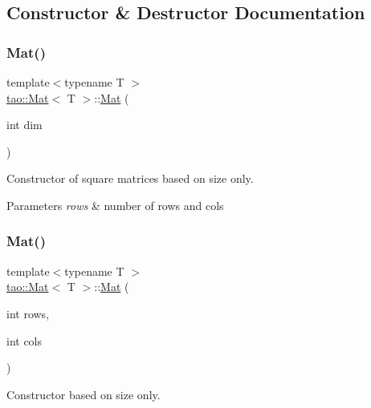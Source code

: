 \subsection{Constructor \& Destructor Documentation}
\mbox{\label{classtao_1_1_mat_a22ea16d2a3e3a1da5eb7de57e5bf02c2}} 
\subsubsection{\texorpdfstring{Mat()}{Mat()}\hspace{0.1cm}{\footnotesize\ttfamily [1/5]}}
{\footnotesize\ttfamily template$<$typename T $>$ \\
\mbox{\hyperlink{classtao_1_1_mat}{tao\+::\+Mat}}$<$ T $>$\+::\mbox{\hyperlink{classtao_1_1_mat}{Mat}} (\begin{DoxyParamCaption}\item[{int}]{dim }\end{DoxyParamCaption})}



Constructor of square matrices based on size only. 


\begin{DoxyParams}{Parameters}
{\em rows} & number of rows and cols \\
\hline
\end{DoxyParams}
\mbox{\label{classtao_1_1_mat_a8b2f68a1f5539462e6f4186bc5f8a5c7}} 
\subsubsection{\texorpdfstring{Mat()}{Mat()}\hspace{0.1cm}{\footnotesize\ttfamily [2/5]}}
{\footnotesize\ttfamily template$<$typename T $>$ \\
\mbox{\hyperlink{classtao_1_1_mat}{tao\+::\+Mat}}$<$ T $>$\+::\mbox{\hyperlink{classtao_1_1_mat}{Mat}} (\begin{DoxyParamCaption}\item[{int}]{rows,  }\item[{int}]{cols }\end{DoxyParamCaption})}



Constructor based on size only. 



